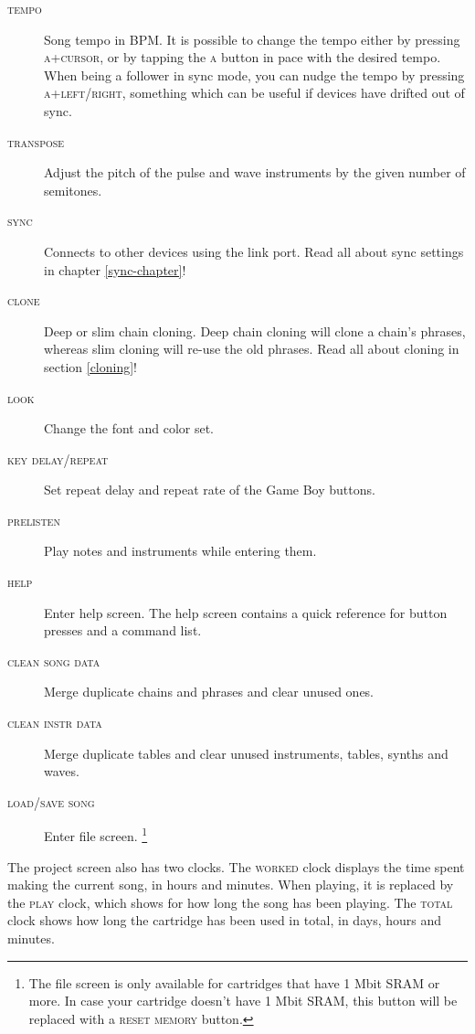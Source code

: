 \begin{description}
	\item[\textsc{tempo}] Song tempo in BPM. It is possible to change the tempo either by pressing
\textsc{a+cursor}, or by tapping the \textsc{a} button in pace with the desired tempo. When being a
follower in sync mode, you can nudge the tempo by pressing \textsc{a+left/right}, something which
can be useful if devices have drifted out of sync.
	\item[\textsc{transpose}] Adjust the pitch of the pulse and wave instruments by the given number of semitones.
	\item[\textsc{sync}] Connects to other devices using the link port. Read all about sync settings in chapter \ref{sync-chapter}!

	\item[\textsc{clone}] Deep or slim chain cloning. Deep chain cloning will clone a chain's phrases, whereas slim cloning will re-use the old phrases. Read all about cloning in section \ref{cloning}!
	\item[\textsc{look}] Change the font and color set.
	\item[\textsc{key delay/repeat}] Set repeat delay and repeat rate of the Game Boy buttons.
	\item[\textsc{prelisten}] Play notes and instruments while entering them.

	\item[\textsc{help}] Enter help screen. The help screen contains a quick reference for button presses and a command list.
	\item[\textsc{clean song data}] Merge duplicate chains and phrases and clear unused ones. \label{clean-song-data}
	\item[\textsc{clean instr data}] Merge duplicate tables and clear unused instruments, tables, synths and waves.
	\item[\textsc{load/save song}] Enter file screen. \footnote{The file screen is only available for cartridges that have 1 Mbit SRAM or more. In case your cartridge doesn't have 1 Mbit SRAM, this button will be replaced with a \textsc{reset memory} button.}
\end{description}

The project screen also has two clocks.
The \textsc{worked} clock displays the time spent making the current song, in hours and minutes.
When playing, it is replaced by the \textsc{play} clock, which shows for how long the song has been playing.
The \textsc{total} clock shows how long the cartridge has been used in total, in days, hours and minutes.

